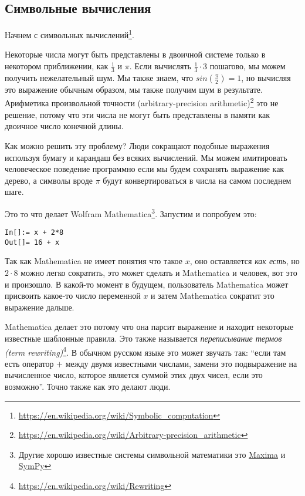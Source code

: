 \subsection{Символьные вычисления}

Начнем с символьных вычислений\footnote{\url{https://en.wikipedia.org/wiki/Symbolic_computation}}.

Некоторые числа могут быть представлены в двоичной системе только в некотором приближении, как $\frac{1}{3}$ и $\pi$.
Если вычислять $\frac{1}{3} \cdot 3$ пошагово, мы можем получить нежелательный шум. %
Мы также знаем, что $sin(\frac{\pi}{2}) = 1$, но вычисляя это выражение обычным образом, мы также получим шум в результате.
Арифметика произвольной точности (arbitrary-precision arithmetic)\footnote{\url{https://en.wikipedia.org/wiki/Arbitrary-precision_arithmetic}} это не решение, потому что эти числа не могут быть представлены в памяти 
как двоичное число конечной длины.

Как можно решить эту проблему?
Люди сокращают подобные выражения используя бумагу и карандаш без всяких вычислений.
Мы можем имитировать человеческое поведение программно если мы будем сохранять выражение как дерево,
а символы вроде $\pi$ будут конвертироваться в числа на самом последнем шаге.

Это то что делает Wolfram Mathematica\footnote{Другие хорошо известные системы символьной математики это 
\href{https://en.wikipedia.org/wiki/Maxima_\%28software\%29}{Maxima} и 
\href{https://en.wikipedia.org/wiki/SymPy}{SymPy}}.
Запустим и попробуем это:

\begin{lstlisting}
In[]:= x + 2*8
Out[]= 16 + x
\end{lstlisting}

Так как Mathematica не имеет понятия что такое $x$, оно оставляется \textit{как есть}, но $2 \cdot 8$ можно легко
сократить, это может сделать и Mathematica и человек, вот это и произошло.
В какой-то момент в будущем, пользователь Mathematica может присвоить какое-то число переменной
$x$ и затем Mathematica сократит это выражение дальше.

Mathematica делает это потому что она парсит выражение и находит некоторые известные шаблонные правила.
Это также называется \textit{переписывание термов (term rewriting)}\footnote{\url{https://en.wikipedia.org/wiki/Rewriting}}.
В обычном русском языке это может звучать так:
``если там есть оператор $+$ между двумя известными числами, замени это подвыражение на вычисленное число, которое является
суммой этих двух чисел, если это возможно''.
Точно также как это делают люди.

